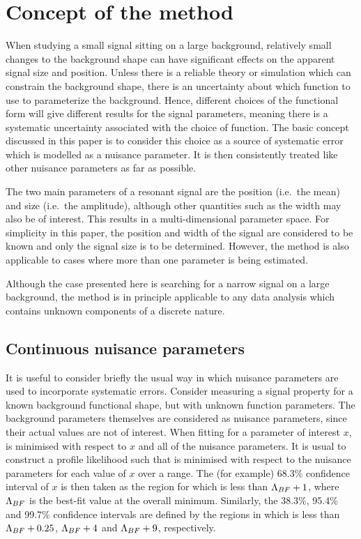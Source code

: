 \section{Concept of the method} %
\label{sec:concept}

When studying a small signal sitting on
a large background, relatively small changes to the background shape can
have significant effects on the apparent signal size and position.
Unless there is a
reliable theory or simulation which can constrain the background shape,
there is an uncertainty about which function to use to parameterize 
the background. Hence, different choices of the functional form
will give different results for the signal parameters, meaning there is a
systematic uncertainty associated with the choice of function.
The basic concept discussed in this paper is to consider this choice
as a source of systematic error which is modelled as a nuisance parameter.
It is then consistently treated like other nuisance parameters as far as
possible.

The two main parameters of a resonant signal are the position (i.e.~the mean)
and size (i.e.~the amplitude), although other
quantities such as the width may also be of interest. This results in a
multi-dimensional parameter space. For simplicity in this paper, the position
and width of the signal are considered to be known and only the signal
size is to be determined. However, the method is also applicable to
cases where more than one parameter is being estimated.

Although the case presented here is searching for a narrow signal 
on a large background, the method is in principle applicable to any data 
analysis which contains unknown components of a discrete nature.

\subsection{Continuous nuisance parameters}
\label{sec:concept:continuous}

It is useful to consider briefly the usual way in which nuisance
parameters are used to incorporate systematic errors. Consider measuring a signal
property for a known background functional shape, but with unknown function
parameters. The background parameters themselves are considered as
nuisance parameters, since their actual values are not of interest.
When fitting for a parameter of interest $x$, \nll
is minimised with respect to $x$ and all of the
nuisance parameters. It is usual to construct a profile likelihood
such that \nll is minimised with respect to the nuisance parameters
for each value of $x$ over a range.
The (for example) 68.3\% confidence interval of $x$
is then
taken as the region for which \nll is less than ${\rm \Lambda}_{BF}+1$,
where ${\rm \Lambda}_{BF}$ is the best-fit value at the overall minimum.
Similarly, the 38.3\%, 95.4\% and 99.7\% confidence intervals are defined by the
regions in which \nll is less than ${\rm \Lambda}_{BF}+0.25$, ${\rm \Lambda}_{BF}+4$
and ${\rm \Lambda}_{BF}+9$, respectively.

